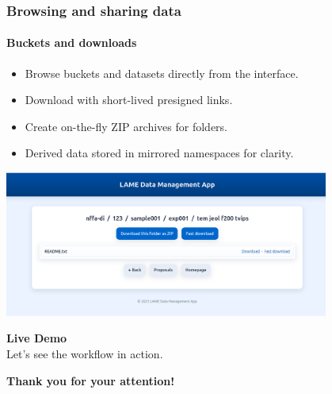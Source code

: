 \documentclass{beamer}
\begin{document}
	\begin{frame}
		\frametitle{Browsing and sharing data}
		\framesubtitle{Buckets and downloads}
		
		\begin{itemize}
			\item Browse buckets and datasets directly from the interface.
			\item Download with short-lived presigned links.
			\item Create on-the-fly ZIP archives for folders.
			\item Derived data stored in mirrored namespaces for clarity.
		\end{itemize}
		
		\vspace{1em}
		\centering
		\includegraphics[width=0.8\textwidth]{otherResources/ui_bucket_experiment.png}
	\end{frame}
	
	\begin{frame}
		\centering
		\vfill
		{\Huge \textbf{Live Demo}} \\[1.5em]
		{\Large Let’s see the workflow in action.}
		\vfill
	\end{frame}
	
	\begin{frame}
		\centering
		\vfill
		{\Huge \textbf{Thank you for your attention!}} \\[1.5em]
		\vfill
	\end{frame}
	
\end{document}
